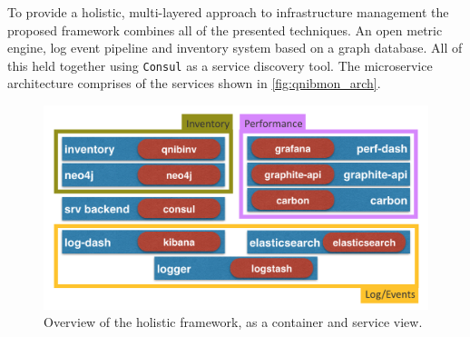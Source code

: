 To provide a holistic, multi-layered approach to infrastructure management the proposed framework combines
all of the presented techniques.
An open metric engine, log event pipeline and inventory system based on a graph database.
All of this held together using \texttt{Consul} as a service discovery
tool.
The microservice architecture comprises of the services shown in \autoref{fig:qnibmon_arch}.
\begin{figure}[!ht]
    \includegraphics[width=.4\textwidth]{images/png/qnibmon_arch.png}
    \caption{\label{fig:qnibmon_arch}Overview of the holistic framework, as a container and service view.}
\end{figure}
